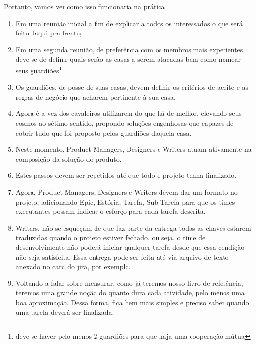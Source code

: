 Portanto, vamos ver como isso funcionaria na prática
\begin{enumerate}
    \item Em uma reunião inicial a fim de explicar a todos os interessados o que será feito daqui pra frente;
    \item Em uma segunda reunião, de preferência com os membros mais experientes, deve-se de definir quais serão as casas a serem atacadas bem como nomear seus guardiões\footnote{deve-se haver pelo menos 2 guardiões para que haja uma cooperação mútua}
    \item Os guardiões, de posse de suas casas, devem definir os critérios de aceite e as regras de negócio que acharem pertinente à sua casa.
    \item Agora é a vez dos cavaleiros utilizarem do que há de melhor, elevando seus cosmos ao sétimo sentido, propondo soluções engenhosas que capazes de cobrir tudo que foi proposto pelos guardiões daquela casa. 
    \item Neste momento, Product Managers, Designers e Writers atuam ativamente na composição da solução do produto.
    \item Estes passos devem ser repetidos até que todo o projeto tenha finalizado. 
    \item Agora, Product Managers, Designers e Writers devem dar um formato no projeto, adicionando Epic, Estória, Tarefa, Sub-Tarefa para que os times executantes possam indicar o esforço para cada tarefa descrita. 
    \item Writers, não se esqueçam de que faz parte da entrega todas as chaves estarem traduzidas quando o projeto estiver fechado, ou seja, o time de desenvolvimento não poderá iniciar qualquer tarefa desde que essa condição não seja satisfeita. Essa entrega pode ser feita até via arquivo de texto anexado no card do jira, por exemplo.
    \item Voltando a falar sobre mensurar, como já teremos nosso livro de referência, teremos uma grande noção do quanto dura cada atividade, pelo menos uma boa aproximação. Dessa forma, fica bem mais simples e preciso saber quando uma tarefa deverá ser finalizada.
\end{enumerate}
